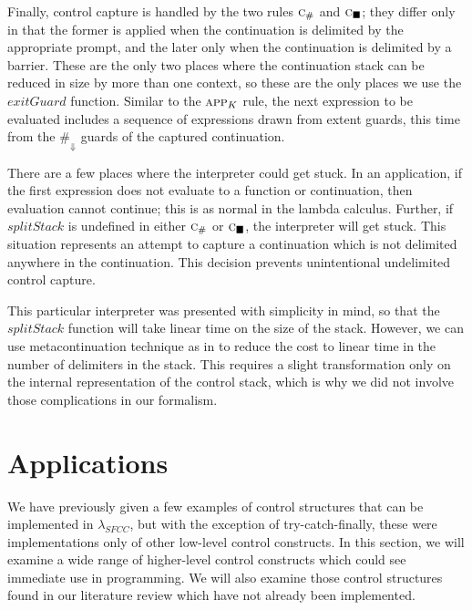 \documentclass[11pt]{article}
\newcommand{\maybePage}{\newpage}
\begin{document}
Finally, control capture is handled by the two rules $\textsc{c}_\#$ and $\textsc{c}_\blacksquare$;
they differ only in that the former is applied when the continuation is delimited by the appropriate prompt, and the later only when the continuation is delimited by a barrier.
These are the only two places where the continuation stack can be reduced in size by more than one context, so these are the only places we use the $exitGuard$ function.
Similar to the $\textsc{app}_K$ rule, the next expression to be evaluated includes a sequence of expressions drawn from extent guards, this time from the $\#_\Downarrow$ guards of the captured continuation.

There are a few places where the interpreter could get stuck.
In an application, if the first expression does not evaluate to a function or continuation, then evaluation cannot continue; this is as normal in the lambda calculus.
Further, if $splitStack$ is undefined in either $\textsc{c}_\#$ or $\textsc{c}_\blacksquare$, the interpreter will get stuck.
This situation represents an attempt to capture a continuation which is not delimited anywhere in the continuation.
This decision prevents unintentional undelimited control capture.

This particular interpreter was presented with simplicity in mind, so that the $splitStack$ function will take linear time on the size of the stack.
However, we can use metacontinuation technique as in \cite{MFDC} to reduce the cost to linear time in the number of delimiters in the stack.
This requires a slight transformation only on the internal representation of the control stack, which is why we did not involve those complications in our formalism.

\maybePage
\section{Applications}
\label{sec:applications}

We have previously given a few examples of control structures that can be implemented in $\lambda_{SFCC}$, but with the exception of try-catch-finally, these were implementations only of other low-level control constructs.
In this section, we will examine a wide range of higher-level control constructs which could see immediate use in programming.
We will also examine those control structures found in our literature review which have not already been implemented.

\end{document}
